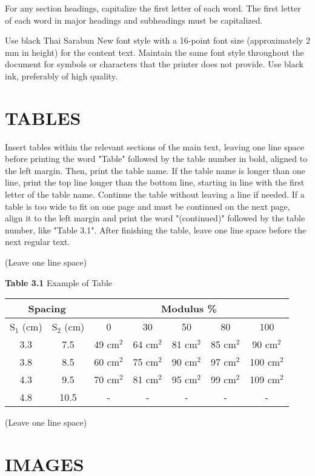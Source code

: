 For any section headings, capitalize the first letter of each word. The first letter of each word in major headings and subheadings must be capitalized.

Use black Thai Sarabun New font style with a 16-point font size (approximately 2 mm in height) for the content text. Maintain the same font style throughout the document for symbols or characters that the printer does not provide. Use black ink, preferably of high quality.

\section{TABLES}

Insert tables within the relevant sections of the main text, leaving one line space before printing the word "Table" followed by the table number in bold, aligned to the left margin. Then, print the table name. If the table name is longer than one line, print the top line longer than the bottom line, starting in line with the first letter of the table name. Continue the table without leaving a line if needed. If a table is too wide to fit on one page and must be continued on the next page, align it to the left margin and print the word "(continued)" followed by the table number, like "Table 3.1". After finishing the table, leave one line space before the next regular text.

(Leave one line space)

\textbf{Table 3.1} Example of Table

\begin{table}[h]
\centering
\begin{tabular}{|c|c|c|c|c|c|c|}
\hline
\multicolumn{2}{|c|}{Spacing} & \multicolumn{5}{c|}{Modulus \%} \\
\hline
S$_1$ (cm) & S$_2$ (cm) & 0 & 30 & 50 & 80 & 100 \\
\hline
3.3 & 7.5 & 49 cm$^2$ & 64 cm$^2$ & 81 cm$^2$ & 85 cm$^2$ & 90 cm$^2$ \\
3.8 & 8.5 & 60 cm$^2$ & 75 cm$^2$ & 90 cm$^2$ & 97 cm$^2$ & 100 cm$^2$ \\
4.3 & 9.5 & 70 cm$^2$ & 81 cm$^2$ & 95 cm$^2$ & 99 cm$^2$ & 109 cm$^2$ \\
4.8 & 10.5 & - & - & - & - & - \\
\hline
\end{tabular}
\end{table}

(Leave one line space)

\section{IMAGES}

